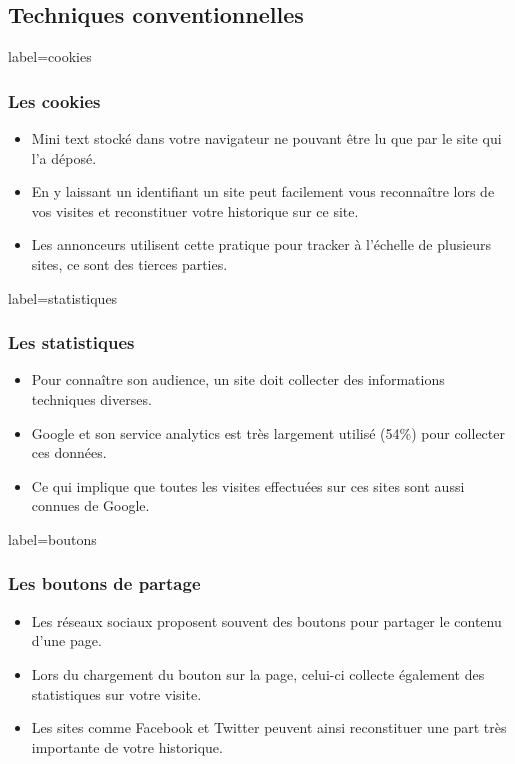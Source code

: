 \documentclass{beamer}
\begin{document}
    \subsection{Techniques conventionnelles}
        \begin{frame}{label=cookies}
            \frametitle{Les cookies}
            \begin{center}
                \begin{itemize}
                    \item Mini text stocké dans votre navigateur ne pouvant être lu que par le site qui l'a déposé.
                    \item En y laissant un identifiant un site peut facilement vous reconnaître lors de vos visites et reconstituer votre historique sur ce site.
                    \item Les annonceurs utilisent cette pratique pour tracker à l'échelle de plusieurs sites, ce sont des tierces parties.
                \end{itemize}
            \end{center}
        \end{frame}
        \begin{frame}{label=statistiques}
            \frametitle{Les statistiques}
            \begin{center}
                \begin{itemize}
                    \item Pour connaître son audience, un site doit collecter des informations techniques diverses.
                    \item Google et son service analytics est très largement utilisé (54\%) pour collecter ces données.
                    \item Ce qui implique que toutes les visites effectuées sur ces sites sont aussi connues de Google.
                \end{itemize}
            \end{center}
        \end{frame}
        \begin{frame}{label=boutons}
            \frametitle{Les boutons de partage}
            \begin{center}
                \begin{itemize}
                    \item Les réseaux sociaux proposent souvent des boutons pour partager le contenu d'une page.
                    \item Lors du chargement du bouton sur la page, celui-ci collecte également des statistiques sur votre visite.
                    \item Les sites comme Facebook et Twitter peuvent ainsi reconstituer une part très importante de votre historique.
                \end{itemize}
            \end{center}
        \end{frame}
\end{document}
